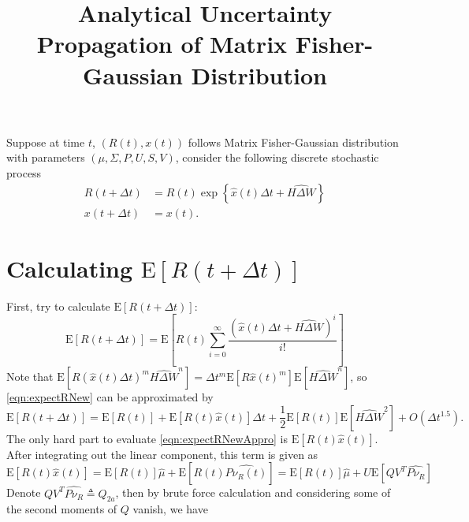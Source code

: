\documentclass[10pt]{article}
\title{\vspace{-4ex}\textbf{Analytical Uncertainty Propagation of Matrix Fisher-Gaussian Distribution\vspace{-4ex}}}
\date{}
\newcommand{\expect}[1]{\ensuremath{\mathrm{E}\left[ #1 \right]}}
\begin{document}
\maketitle

Suppose at time $t$, $(R(t),x(t))$ follows Matrix Fisher-Gaussian distribution with parameters $(\mu,\Sigma,P,U,S,V)$, consider the following discrete stochastic process
\begin{align}
	R(t+\Delta t) &= R(t)\exp\left\{\hat{x}(t)\Delta t + \widehat{H\Delta W}\right\} \label{eqn:gyroKine} \\
	x(t+\Delta t) &= x(t).
\end{align}

\section{Calculating $\expect{R(t+\Delta t)}$}
First, try to calculate $\expect{R(t+\Delta t)}$:
\begin{equation} \label{eqn:expectRNew}
	\expect{R(t+\Delta t)} = \expect{R(t)\sum_{i=0}^{\infty}\frac{\left(\hat{x}(t)\Delta t + \widehat{H\Delta W}\right)^i}{i!}}
\end{equation}
Note that $\expect{R(\hat{x}(t)\Delta t)^m\widehat{H\Delta W}^n} = \Delta t^m\expect{R\hat{x}(t)^m}\expect{\widehat{H\Delta W}^n}$, so \eqref{eqn:expectRNew} can be approximated by
\begin{equation} \label{eqn:expectRNewAppro}
	\expect{R(t+\Delta t)} = \expect{R(t)} + \expect{R(t)\hat{x}(t)}\Delta t + \frac{1}{2}\expect{R(t)}\expect{\widehat{H\Delta W}^2} + O(\Delta t^{1.5}).
\end{equation}
The only hard part to evaluate \eqref{eqn:expectRNewAppro} is $\expect{R(t)\hat{x}(t)}$.
After integrating out the linear component, this term is given as
\begin{equation}
	\expect{R(t)\hat{x}(t)} = \expect{R(t)}\hat{\mu}+\expect{R(t)\widehat{P\nu_R(t)}} = \expect{R(t)}\hat{\mu}+U\expect{QV^T\widehat{P\nu_R}}
\end{equation}
Denote $QV^T\widehat{P\nu_R} \triangleq Q_{2a}$, then by brute force calculation and considering some of the second moments of $Q$ vanish, we have
\end{document}
